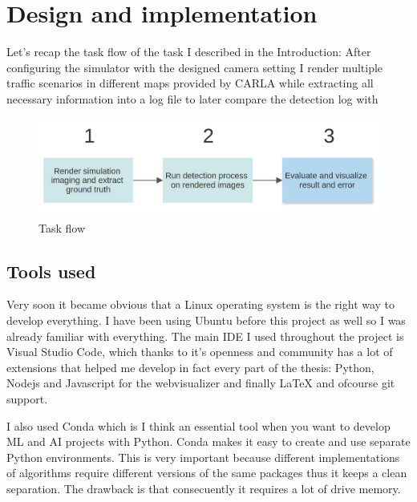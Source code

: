 \chapter{Design and implementation}
\label{chap:designimplementation}

Let's recap the task flow of the task I described in the Introduction: After
configuring the simulator with the designed camera setting I render multiple
traffic scenarios in different maps provided by CARLA while extracting all
necessary information into a log file to later compare the detection log with


\begin{figure}[!ht]
    \centering
    \includegraphics[width=150mm, keepaspectratio]{figures/flowchart.png}
    \caption{Task flow}
    \label{fig:flow2}
\end{figure}


\section{Tools used}

Very soon it became obvious that a Linux operating system is the right way to
develop everything. I have been using Ubuntu before this project as well so I
was already familiar with everything. The main IDE I used throughout the project
is Visual Studio Code, which thanks to it's openness and community has a lot of
extensions that helped me develop in fact every part of the thesis: Python,
Nodejs and Javascript for the webvisualizer and finally LaTeX and ofcourse git
support.

I also used Conda which is I think an essential tool when you want to develop ML
and AI projects with Python. Conda makes it easy to create and use separate
Python environments. This is very important because different implementations of
algorithms require different versions of the same packages thus it keeps a clean
separation. The drawback is that consecuently it requires a lot of drive memory.

